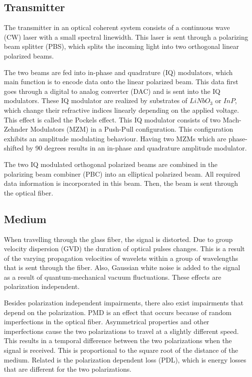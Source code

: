 \documentclass[journal,10pt,twoside, a4paper]{IEEEtran}
\begin{document}
\subsection{Transmitter}
The transmitter in an optical coherent system consists of a continuous wave (CW) laser with a small spectral linewidth. This laser is sent through a polarizing beam splitter (PBS), which splits the incoming light into two orthogonal linear polarized beams. 

The two beams are fed into in-phase and quadrature (IQ) modulators, which main function is to encode data onto the linear polarized beam. This data first goes through a digital to analog converter (DAC) and is sent into the IQ modulators. These IQ modulator are realized by substrates of $LiNbO_3$ or $InP$, which change their refractive indices linearly depending on the applied voltage. This effect is called the Pockels effect. This IQ modulator consists of two Mach-Zehnder Modulators (MZM) in a Push-Pull configuration. This configuration exhibits an amplitude modulating behaviour. Having two MZMs which are phase-shifted by 90 degrees results in an in-phase and quadrature amplitude modulator.

The two IQ modulated orthogonal polarized beams are combined in the polarizing beam combiner (PBC) into an elliptical polarized beam. All required data information is incorporated in this beam. Then, the beam is sent through the optical fiber.

\subsection{Medium}\label{ch:Medium}
When travelling through the glass fiber, the signal is distorted. Due to group velocity dispersion (GVD) the duration of optical pulses changes. This is a result of the varying propagation velocities of wavelets within a group of wavelengths that is sent through the fiber. Also, Gaussian white noise is added to the signal as a result of quantum-mechanical vacuum fluctuations\cite{coherent_detection}. These effects are polarization independent. 

Besides polarization independent impairments, there also exist impairments that depend on the polarization. PMD is an effect that occurs because of random imperfections in the optical fiber. Asymmetrical properties and other imperfections cause the two polarizations to travel at a slightly different speed. This results in a temporal difference between the two polarizations when the signal is received\cite{PMD}. This is proportional to the square root of the distance of the medium. Related is the polarization dependent loss (PDL), which is energy losses that are different for the two polarizations.
\end{document}
